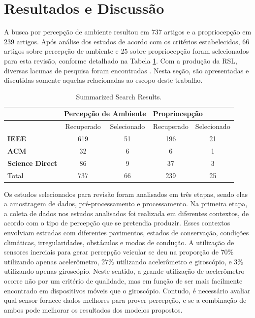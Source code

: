 \section{Resultados e Discussão}

A busca por percepção de ambiente resultou em 737 artigos e a propriocepção em 239 artigos. Após análise dos estudos de acordo com os critérios estabelecidos, 66 artigos sobre percepção de ambiente e 25 sobre propriocepção foram selecionados para esta revisão, conforme detalhado na Tabela \ref{tabela:resultados_sumarizados_busca}. Com a produção da RSL, diversas lacunas de pesquisa foram encontradas \cite{menegazzo2018}. Nesta seção, são apresentadas e discutidas somente aquelas relacionadas ao escopo deste trabalho. 

\begin{table}[h]
    \caption{Summarized Search Results.}
    \label{tabela:resultados_sumarizados_busca}
    \centering
    \begin{tabular}{l c c c c}
        \toprule
        & \multicolumn{2}{l}{\textbf{Percepção de Ambiente}} & \multicolumn{2}{l}{\textbf{Propriocepção}} \\
        \toprule
        & Recuperado & Selecionado & Recuperado & Selecionado \\
        \toprule
        \textbf{IEEE} & 619 & 51 & 196 & 21 \\
        \midrule
        \textbf{ACM} & 32 & 6 & 6 & 1 \\
        \midrule
        \textbf{Science Direct} & 86 & 9 & 37 & 3 \\
        \toprule
        Total & 737 & 66 & 239 & 25 \\
        \bottomrule
    \end{tabular}
\end{table}

Os estudos selecionados para revisão foram analisados em três etapas, sendo elas a amostragem de dados, pré-processamento e processamento. Na primeira etapa, a coleta de dados nos estudos analisados foi realizada em diferentes contextos, de acordo com o tipo de percepção que se pretendia produzir. Esses contextos envolviam estradas com diferentes pavimentos, estados de conservação, condições climáticas, irregularidades, obstáculos e modos de condução. A utilização de sensores inerciais para gerar percepção veicular se deu na proporção de 70\% utilizando apenas acelerômetro, 27\% utilizando acelerômetro e giroscópio, e 3\% utilizando apenas giroscópio. Neste sentido, a grande utilização de acelerômetro ocorre não por um critério de qualidade, mas em função de ser mais facilmente encontrado em dispositivos móveis que o giroscópio. Contudo, é necessário avaliar qual sensor fornece dados melhores para prover percepção, e se a combinação de ambos pode melhorar os resultados dos modelos propostos.

